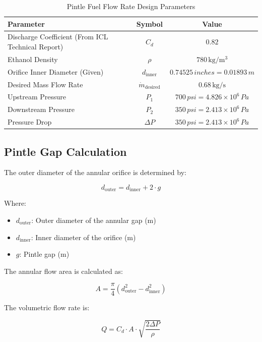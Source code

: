 \begin{table}[H]
\centering
\begin{tabular}{|l|c|c|}
\hline
\textbf{Parameter} & \textbf{Symbol} & \textbf{Value} \\ 
\hline
Discharge Coefficient (From ICL Technical Report) & $C_d$ & $0.82$ \\ 
\hline
Ethanol Density & $\rho$ & $780 \, \si{\kilo\gram\per\meter^3}$ \\ 
\hline
Orifice Inner Diameter (Given) & $d_{\text{inner}}$ & $0.74525 \, \si{inches} = 0.01893 \, \si{m}$ \\ 
\hline
Desired Mass Flow Rate & $\dot{m}_{\text{desired}}$ & $0.68 \, \si{\kilo\gram\per\second}$ \\ 
\hline
Upstream Pressure & $P_1$ & $700 \, \si{psi} = 4.826 \times 10^6 \, \si{Pa}$ \\ 
\hline
Downstream Pressure & $P_2$ & $350 \, \si{psi} = 2.413 \times 10^6 \, \si{Pa}$ \\ 
\hline
Pressure Drop & $\Delta P$ & $350 \, \si{psi} = 2.413 \times 10^6 \, \si{Pa}$ \\ 
\hline
\end{tabular}
\caption{Pintle Fuel Flow Rate Design Parameters}
\label{tab:orifice_parameters}
\end{table}

\subsection{Pintle Gap Calculation}

The outer diameter of the annular orifice is determined by:

\[
d_{\text{outer}} = d_{\text{inner}} + 2 \cdot g
\]

Where:
\begin{itemize}
    \item \( d_{\text{outer}} \): Outer diameter of the annular gap (m)
    \item \( d_{\text{inner}} \): Inner diameter of the orifice (m)
    \item \( g \): Pintle gap (m)
\end{itemize}

The annular flow area is calculated as:

\[
A = \frac{\pi}{4} \left(d_{\text{outer}}^2 - d_{\text{inner}}^2 \right)
\]

The volumetric flow rate is:

\[
Q = C_d \cdot A \cdot \sqrt{\frac{2 \Delta P}{\rho}}
\]

